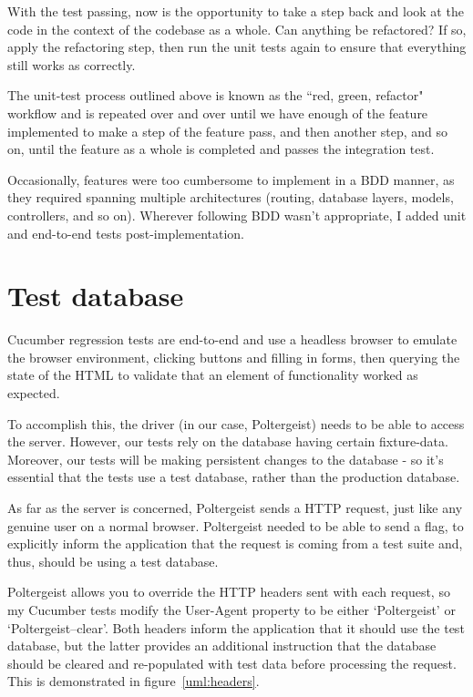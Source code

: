 With the test passing, now is the opportunity to take a step back and look at the code in the context of the codebase as a whole. Can anything be refactored? If so, apply the refactoring step, then run the unit tests again to ensure that everything still works as correctly.

The unit-test process outlined above is known as the ``red, green, refactor" workflow and is repeated over and over until we have enough of the feature implemented to make a step of the feature pass, and then another step, and so on, until the feature as a whole is completed and passes the integration test.

Occasionally, features were too cumbersome to implement in a BDD manner, as they required spanning multiple architectures (routing, database layers, models, controllers, and so on). Wherever following BDD wasn't appropriate, I added unit and end-to-end tests post-implementation.

\section{Test database}

Cucumber regression tests are end-to-end and use a headless browser to emulate the browser environment, clicking buttons and filling in forms, then querying the state of the HTML to validate that an element of functionality worked as expected.

To accomplish this, the driver (in our case, Poltergeist) needs to be able to access the server. However, our tests rely on the database having certain fixture-data. Moreover, our tests will be making persistent changes to the database - so it's essential that the tests use a test database, rather than the production database.

As far as the server is concerned, Poltergeist sends a HTTP request, just like any genuine user on a normal browser. Poltergeist needed to be able to send a flag, to explicitly inform the application that the request is coming from a test suite and, thus, should be using a test database.

Poltergeist allows you to override the HTTP headers sent with each request, so my Cucumber tests modify the User-Agent property to be either `Poltergeist' or `Poltergeist--clear'. Both headers inform the application that it should use the test database, but the latter provides an additional instruction that the database should be cleared and re-populated with test data before processing the request. This is demonstrated in figure~\ref{uml:headers}.

